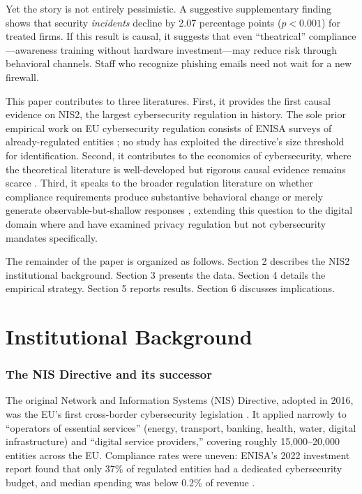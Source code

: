 \documentclass[12pt]{article}
\begin{document}
Yet the story is not entirely pessimistic. A suggestive supplementary finding shows that security \textit{incidents} decline by 2.07 percentage points ($p < 0.001$) for treated firms. If this result is causal, it suggests that even ``theatrical'' compliance---awareness training without hardware investment---may reduce risk through behavioral channels. Staff who recognize phishing emails need not wait for a new firewall.

This paper contributes to three literatures. First, it provides the first causal evidence on NIS2, the largest cybersecurity regulation in history. The sole prior empirical work on EU cybersecurity regulation consists of ENISA surveys of already-regulated entities \citep{enisa2022nis, enisa2023nis}; no study has exploited the directive's size threshold for identification. Second, it contributes to the economics of cybersecurity, where the theoretical literature is well-developed \citep{gordon2002economics, anderson2006economics, august2014economics} but rigorous causal evidence remains scarce \citep{romanosky2016examining}. Third, it speaks to the broader regulation literature on whether compliance requirements produce substantive behavioral change or merely generate observable-but-shallow responses \citep{peltzman1976toward, bandiera2009active}, extending this question to the digital domain where \citet{acquisti2016economics} and \citet{aridor2023effect} have examined privacy regulation but not cybersecurity mandates specifically.

The remainder of the paper is organized as follows. Section 2 describes the NIS2 institutional background. Section 3 presents the data. Section 4 details the empirical strategy. Section 5 reports results. Section 6 discusses implications.


\section{Institutional Background}

\subsubsection*{The NIS Directive and its successor} The original Network and Information Systems (NIS) Directive, adopted in 2016, was the EU's first cross-border cybersecurity legislation \citep{eu2016nis}. It applied narrowly to ``operators of essential services'' (energy, transport, banking, health, water, digital infrastructure) and ``digital service providers,'' covering roughly 15,000--20,000 entities across the EU. Compliance rates were uneven: ENISA's 2022 investment report found that only 37\% of regulated entities had a dedicated cybersecurity budget, and median spending was below 0.2\% of revenue \citep{enisa2022nis}.
\end{document}
